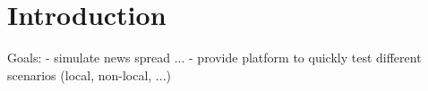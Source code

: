 \section{Introduction}

Goals:
- simulate news spread ...
- provide platform to quickly test different scenarios (local, non-local, ...)